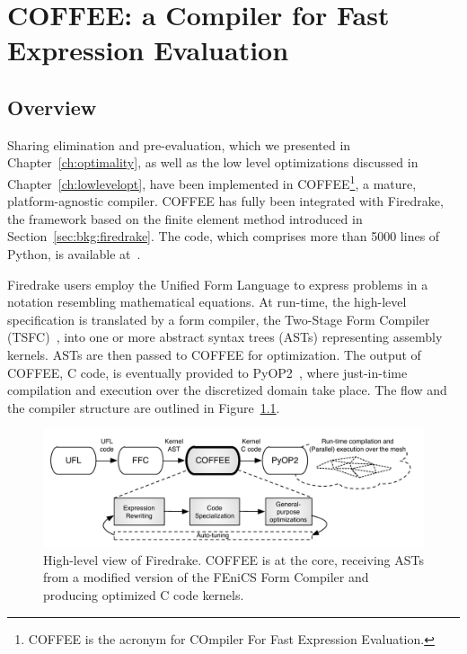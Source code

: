 \chapter{COFFEE: a Compiler for Fast Expression Evaluation}
\label{ch:coffee}

\section{Overview}
Sharing elimination and pre-evaluation, which we presented in Chapter~\ref{ch:optimality}, as well as the low level optimizations discussed in Chapter~\ref{ch:lowlevelopt}, have been implemented in COFFEE\footnote{COFFEE is the acronym for COmpiler For Fast Expression Evaluation.}, a mature, platform-agnostic compiler. COFFEE has fully been integrated with Firedrake, the framework based on the finite element method introduced in Section~\ref{sec:bkg:firedrake}. The code, which comprises more than 5000 lines of Python, is available at~\citep{coffee-code}.

Firedrake users employ the Unified Form Language to express problems in a notation resembling mathematical equations. At run-time, the high-level specification is translated by a form compiler, the Two-Stage Form Compiler (TSFC)~\cite{TSFC-Compiler}, into one or more abstract syntax trees (ASTs) representing assembly kernels. ASTs are then passed to COFFEE for optimization. The output of COFFEE, C code, is eventually provided to PyOP2~\citep{pyop2isc}, where just-in-time compilation and execution over the discretized domain take place. The flow and the compiler structure are outlined in Figure~\ref{fig:coffee-pipeline}. 

\begin{figure}
\begin{center}
\includegraphics[scale=0.70]{coffee/pictures/coffee-pipeline.pdf}
\caption{High-level view of Firedrake. COFFEE is at the core, receiving ASTs from a modified version of the FEniCS Form Compiler and producing optimized C code kernels.}
\label{fig:coffee-pipeline}
\end{center}
\end{figure}

